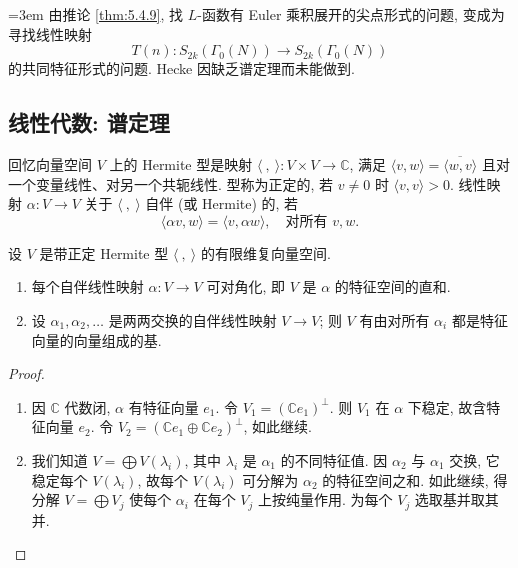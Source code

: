{\emergencystretch=3em 由推论 \ref{thm:5.4.9}, 找 $L$-函数有 Euler 乘积展开的尖点形式的问题, 变成为寻找线性映射
\[
T(n)\colon S_{2k}(\Gamma_0(N))\to S_{2k}(\Gamma_0(N))
\]
的共同特征形式的问题. Hecke 因缺乏谱定理而未能做到.\par}

\subsection*{线性代数: 谱定理}

回忆向量空间 $V$ 上的 Hermite 型是映射 $\langle\ ,\ \rangle\colon V\times V\to\mathbb{C}$, 满足 $\langle v, w\rangle = \overline{\langle w, v\rangle}$ 且对一个变量线性、对另一个共轭线性. 型称为正定的, 若 $v\neq 0$ 时 $\langle v, v\rangle > 0$. 线性映射 $\alpha\colon V\to V$ 关于 $\langle\ ,\ \rangle$ 自伴 (或 Hermite) 的, 若
\[
\langle\alpha v, w\rangle = \langle v, \alpha w\rangle, \quad \text{对所有 } v, w.
\]

\begin{theorem}[谱定理] \label{thm:5.4.16}
设 $V$ 是带正定 Hermite 型 $\langle\ ,\ \rangle$ 的有限维复向量空间.
\begin{enumerate}[label=\textup{(\alph*)}]
\item 每个自伴线性映射 $\alpha\colon V\to V$ 可对角化, 即 $V$ 是 $\alpha$ 的特征空间的直和.
\item 设 $\alpha_1, \alpha_2, \dots$ 是两两交换的自伴线性映射 $V\to V$; 则 $V$ 有由对所有 $\alpha_i$ 都是特征向量的向量组成的基.
\end{enumerate}
\end{theorem}

\begin{proof}
\begin{enumerate}[label=\textup{(\alph*)}]
\item 因 $\mathbb{C}$ 代数闭, $\alpha$ 有特征向量 $e_1$. 令 $V_1 = (\mathbb{C}e_1)^{\perp}$. 则 $V_1$ 在 $\alpha$ 下稳定, 故含特征向量 $e_2$. 令 $V_2 = (\mathbb{C}e_1\oplus\mathbb{C}e_2)^{\perp}$, 如此继续.

\item 我们知道 $V = \bigoplus V(\lambda_i)$, 其中 $\lambda_i$ 是 $\alpha_1$ 的不同特征值. 因 $\alpha_2$ 与 $\alpha_1$ 交换, 它稳定每个 $V(\lambda_i)$, 故每个 $V(\lambda_i)$ 可分解为 $\alpha_2$ 的特征空间之和. 如此继续, 得分解 $V = \bigoplus V_j$ 使每个 $\alpha_i$ 在每个 $V_j$ 上按纯量作用. 为每个 $V_j$ 选取基并取其并.
\end{enumerate}
\end{proof}

